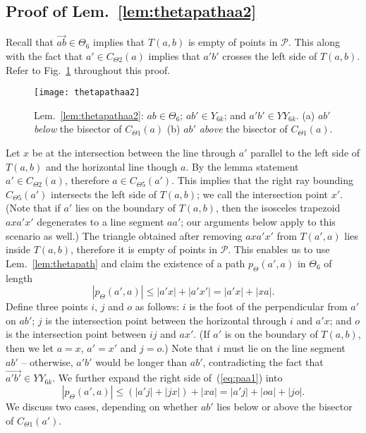 \documentclass[11pt]{article}
\newcommand\cone{{C}}
\newcommand\Pt{\mathcal P}
\newcommand{\arr}[1]{\overrightarrow{#1}}
\begin{document}
\subsection{Proof of Lem.~\ref{lem:thetapathaa2}}
Recall that $\arr{ab} \in \Theta_6$ implies that $T(a, b)$ is empty of points in $\Pt$. This along with the fact that $a' \in \cone_{\Theta2}(a)$ implies that $a'b'$ crosses the left side of $T(a,b)$. Refer to Fig.~\ref{fig:thetapathaa2} throughout this proof.
\begin{figure}[htpb]
\centering
\texttt{[image: thetapathaa2]}
\caption{Lem.~\ref{lem:thetapathaa2}: $ab \in \Theta_6$; $ab' \in Y_{6k}$; and $a'b' \in YY_{6k}$. (a) $ab'$ \emph{below} the bisector of $\cone_{\Theta1}(a)$ (b) $ab'$ \emph{above} the bisector of $\cone_{\Theta1}(a)$.}
\label{fig:thetapathaa2}
\end{figure}
Let $x$ be at the intersection between the line through $a'$ parallel to the left side of $T(a, b)$ and the horizontal line though $a$. By the lemma statement $a' \in \cone_{\Theta2}(a)$, therefore $a \in \cone_{\Theta5}(a')$. This implies that the right ray bounding $\cone_{\Theta5}(a')$ intersects the left side of $T(a, b)$; we call the intersection point $x'$.
(Note that if $a'$ lies on the boundary of $T(a, b)$, then the isosceles trapezoid $axa'x'$ degenerates to a line segment $aa'$; our arguments below apply to this scenario as well.)
The triangle obtained after removing $axa'x'$ from $T(a', a)$ lies inside $T(a, b)$, therefore it is empty of points in $\Pt$. This enables us to use
Lem.~\ref{lem:thetapath} and claim the existence of a path $p_\Theta(a',a)$ in $\Theta_6$ of length
\begin{equation}
|p_\Theta(a',a)| \le |a'x| + |a'x'| = |a'x| + |xa|.
\label{eq:paa1}
\end{equation}
Define three points $i$, $j$ and $o$ as follows: $i$ is the foot of the perpendicular from $a'$ on $ab'$; $j$ is the intersection point between the horizontal through $i$ and $a'x$; and $o$ is the intersection point between $ij$ and $ax'$. (If $a'$ is on the boundary of $T(a,b)$, then we let $a = x$, $a' = x'$ and $j = o$.) Note that $i$ must lie on the line segment $ab'$ -- otherwise, $a'b'$ would be longer than $ab'$, contradicting the fact that $\arr{a'b'} \in YY_{6k}$. We further expand the right side of~(\ref{eq:paa1}) into
\begin{equation}
|p_\Theta(a',a)| \le (|a'j| + |jx|) + |xa| = |a'j| + |oa| + |jo|.
\label{eq:paa1-1}
\end{equation}
We discuss two cases, depending on whether $ab'$ lies below or above the bisector of $\cone_{\Theta1}(a')$.
\end{document}
